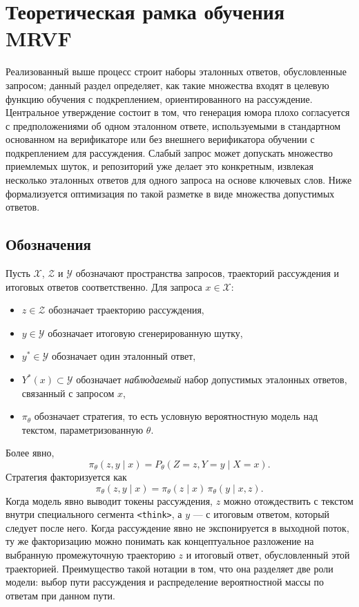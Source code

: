 \section{Теоретическая рамка обучения MRVF}

Реализованный выше процесс строит наборы эталонных ответов, обусловленные запросом; данный раздел определяет, как такие множества входят в целевую функцию обучения с подкреплением, ориентированного на рассуждение. Центральное утверждение состоит в том, что генерация юмора плохо согласуется с предположениями об одном эталонном ответе, используемыми в стандартном основанном на верификаторе или без внешнего верификатора обучении с подкреплением для рассуждения. Слабый запрос может допускать множество приемлемых шуток, и репозиторий уже делает это конкретным, извлекая несколько эталонных ответов для одного запроса на основе ключевых слов. Ниже формализуется оптимизация по такой разметке в виде множества допустимых ответов.

\subsection{Обозначения}

Пусть \(\mathcal{X}\), \(\mathcal{Z}\) и \(\mathcal{Y}\) обозначают пространства запросов, траекторий рассуждения и итоговых ответов соответственно. Для запроса \(x\in\mathcal{X}\):
\begin{itemize}
 \item \(z\in\mathcal{Z}\) обозначает траекторию рассуждения,
 \item \(y\in\mathcal{Y}\) обозначает итоговую сгенерированную шутку,
 \item \(y^{*}\in\mathcal{Y}\) обозначает один эталонный ответ,
 \item \(Y^{*}(x)\subset\mathcal{Y}\) обозначает \emph{наблюдаемый} набор допустимых эталонных ответов, связанный с запросом \(x\),
 \item \(\pi_{\theta}\) обозначает стратегия, то есть условную вероятностную модель над текстом, параметризованную \(\theta\).
\end{itemize}

Более явно,
\[
 \pi_{\theta}(z,y\mid x)=P_{\theta}(Z=z,Y=y\mid X=x).
\]
Стратегия факторизуется как
\[
 \pi_{\theta}(z,y\mid x)=\pi_{\theta}(z\mid x)\,\pi_{\theta}(y\mid x,z).
\]
Когда модель явно выводит токены рассуждения, \(z\) можно отождествить с текстом внутри специального сегмента \texttt{<think>}, а \(y\) --- с итоговым ответом, который следует после него. Когда рассуждение явно не экспонируется в выходной поток, ту же факторизацию можно понимать как концептуальное разложение на выбранную промежуточную траекторию \(z\) и итоговый ответ, обусловленный этой траекторией. Преимущество такой нотации в том, что она разделяет две роли модели: выбор пути рассуждения и распределение вероятностной массы по ответам при данном пути.

